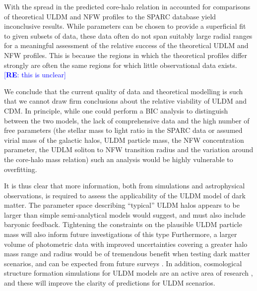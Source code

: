 \documentclass{pasa}%
\newcommand{\re}[1]{\textcolor{blue}{[{\bf RE}: #1]}}
\begin{document}
With the spread in the predicted core-halo relation in accounted for comparisons of theoretical ULDM and NFW profiles to  the SPARC database yield inconclusive results. While  parameters can be chosen to provide a superficial fit to given subsets of data, these data often do not span suitably large radial ranges for a meaningful assessment of the relative success of the theoretical UDLM and NFW profiles. This is because the regions in which the theoretical profiles differ strongly are often the same regions for which little observational data exists.  \re{this is unclear}

We conclude that the current quality of data and theoretical modelling is such that we cannot draw firm conclusions about the relative viability of ULDM and CDM. In principle, while one could perform a BIC analysis to distinguish between the two models, the lack of comprehensive data and the high number of free parameters (the stellar mass to light ratio in the SPARC data or assumed virial mass of the galactic halos,  ULDM particle mass, the NFW concentration parameter, the UDLM soliton to NFW transition radius and the variation around the core-halo mass relation) such an analysis would be highly vulnerable to overfitting.

It is thus clear that more information, both from simulations and astrophysical observations, is required to  assess the applicability of the ULDM model of dark matter. The parameter space describing ``typical'' ULDM halos appears to be larger than simple semi-analytical models would suggest, and must also include  baryonic feedback. Tightening the constraints on the plausible ULDM particle mass will also inform future investigations of this type \cite{Castellano:2019hdd, Lidz:2018fqo, Davoudiasl:2019nlo} Furthermore, a larger volume of photometric data with improved uncertainties covering a greater halo mass range and radius would be of tremendous benefit when testing dark matter scenarios, and can be expected from future surveys  \cite{Simon:2019kmm}. In addition, cosmological structure formation simulations for ULDM models are an active area of research \cite{Lin:2018whl, Clough:2018exo, Mocz:2015sda}, and these will improve the clarity of predictions for ULDM scenarios. %
\end{document}
